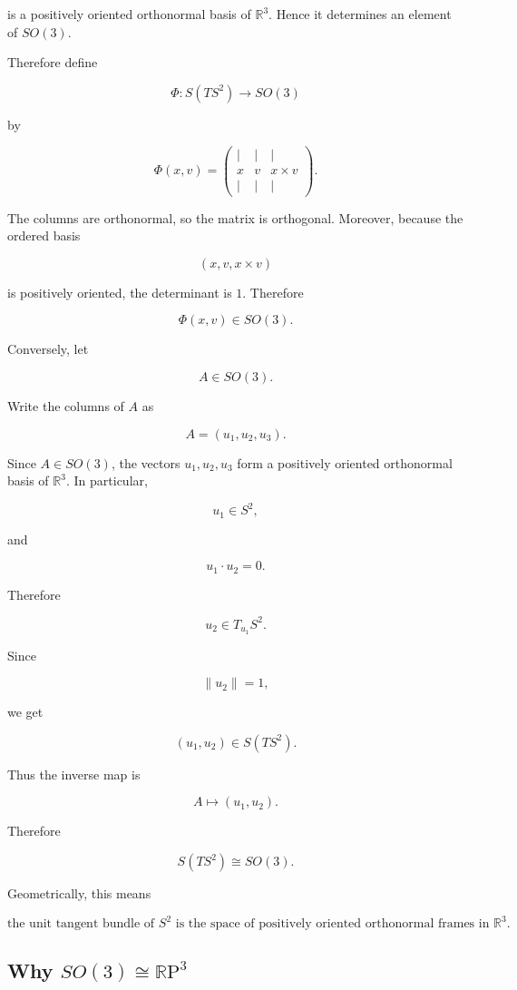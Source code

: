 \documentclass[12pt,a4paper]{article}
\newcommand{\RP}{\mathbb{R}\mathrm{P}}
\newcommand{\R}{\mathbb{R}}
\theoremstyle{notespace}
\begin{document}
	is a positively oriented orthonormal basis of \(\R^{3}\). Hence it determines an element of \(SO(3)\).
	
	Therefore define
	
	\[
	\Phi:S(TS^{2})\to SO(3)
	\]
	
	by
	
	\[
	\Phi(x,v)
	=
	\begin{pmatrix}
		|&|&|\\
		x&v&x\times v\\
		|&|&|
	\end{pmatrix}.
	\]
	
	The columns are orthonormal, so the matrix is orthogonal. Moreover, because the ordered basis
	
	\[
	(x,v,x\times v)
	\]
	
	is positively oriented, the determinant is \(1\). Therefore
	
	\[
	\Phi(x,v)\in SO(3).
	\]
	
	Conversely, let
	
	\[
	A\in SO(3).
	\]
	
	Write the columns of \(A\) as
	
	\[
	A=(u_1,u_2,u_3).
	\]
	
	Since \(A\in SO(3)\), the vectors \(u_1,u_2,u_3\) form a positively oriented orthonormal basis of \(\R^{3}\). In particular,
	
	\[
	u_1\in S^{2},
	\]
	
	and
	
	\[
	u_1\cdot u_2=0.
	\]
	
	Therefore
	
	\[
	u_2\in T_{u_1}S^{2}.
	\]
	
	Since
	
	\[
	\|u_2\|=1,
	\]
	
	we get
	
	\[
	(u_1,u_2)\in S(TS^{2}).
	\]
	
	Thus the inverse map is
	
	\[
	A\mapsto (u_1,u_2).
	\]
	
	Therefore
	
	\[
	\boxed{
		S(TS^{2})\cong SO(3).
	}
	\]
	
	Geometrically, this means
	
	\[
	\boxed{
		\text{the unit tangent bundle of }S^{2}
		\text{ is the space of positively oriented orthonormal frames in }\R^{3}.
	}
	\]
	
	\subsection{Why \(SO(3)\cong \RP^{3}\)}
	
\end{document}

